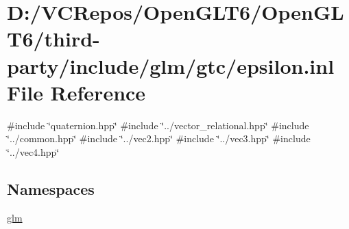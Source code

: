 \hypertarget{epsilon_8inl}{}\section{D\+:/\+V\+C\+Repos/\+Open\+G\+L\+T6/\+Open\+G\+L\+T6/third-\/party/include/glm/gtc/epsilon.inl File Reference}
\label{epsilon_8inl}
{\ttfamily \#include \char`\"{}quaternion.\+hpp\char`\"{}}\newline
{\ttfamily \#include \char`\"{}../vector\+\_\+relational.\+hpp\char`\"{}}\newline
{\ttfamily \#include \char`\"{}../common.\+hpp\char`\"{}}\newline
{\ttfamily \#include \char`\"{}../vec2.\+hpp\char`\"{}}\newline
{\ttfamily \#include \char`\"{}../vec3.\+hpp\char`\"{}}\newline
{\ttfamily \#include \char`\"{}../vec4.\+hpp\char`\"{}}\newline
\subsection*{Namespaces}
\begin{DoxyCompactItemize}
\item 
 \mbox{\hyperlink{namespaceglm}{glm}}
\end{DoxyCompactItemize}
